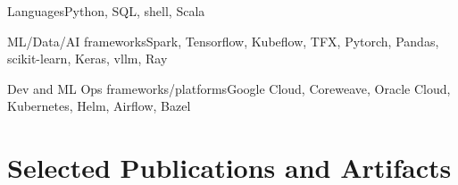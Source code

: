 \documentclass[print]{ag-cv} %
\begin{document}
\begin{skilltype}
  {Languages}{Python, SQL, shell, Scala}
\end{skilltype}
\begin{skilltype}
  {ML/Data/AI frameworks}{Spark, Tensorflow, Kubeflow, TFX, Pytorch, Pandas, scikit-learn, Keras, vllm, Ray}
\end{skilltype}

\begin{skilltype}
  {Dev and ML Ops frameworks/platforms}{Google Cloud, Coreweave, Oracle Cloud, Kubernetes, Helm, Airflow, Bazel}
\end{skilltype}


\section*{Selected Publications and Artifacts}
  
  \newrefcontext[sorting=chronological]
  \nocite{network_induced_memory_contention,
    skullstrip,do_more_with_twitter_data} \leavevmode\printbibliography[heading=none,keyword={selected}] 
    
\end{document}
